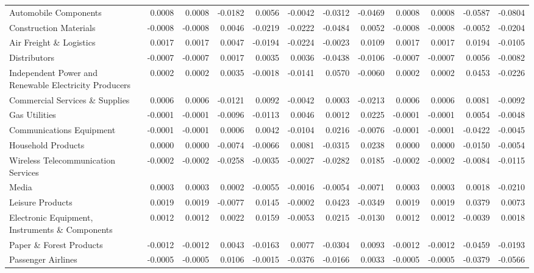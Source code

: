 \begin{table}
\begin{tabular}{lrrrrrrrrrrr}
Automobile Components & 0.0008 & 0.0008 & -0.0182 & 0.0056 & -0.0042 & -0.0312 & -0.0469 & 0.0008 & 0.0008 & -0.0587 & -0.0804 \\
Construction Materials & -0.0008 & -0.0008 & 0.0046 & -0.0219 & -0.0222 & -0.0484 & 0.0052 & -0.0008 & -0.0008 & -0.0052 & -0.0204 \\
Air Freight \& Logistics & 0.0017 & 0.0017 & 0.0047 & -0.0194 & -0.0224 & -0.0023 & 0.0109 & 0.0017 & 0.0017 & 0.0194 & -0.0105 \\
Distributors & -0.0007 & -0.0007 & 0.0017 & 0.0035 & 0.0036 & -0.0438 & -0.0106 & -0.0007 & -0.0007 & 0.0056 & -0.0082 \\
Independent Power and Renewable Electricity Producers & 0.0002 & 0.0002 & 0.0035 & -0.0018 & -0.0141 & 0.0570 & -0.0060 & 0.0002 & 0.0002 & 0.0453 & -0.0226 \\
Commercial Services \& Supplies & 0.0006 & 0.0006 & -0.0121 & 0.0092 & -0.0042 & 0.0003 & -0.0213 & 0.0006 & 0.0006 & 0.0081 & -0.0092 \\
Gas Utilities & -0.0001 & -0.0001 & -0.0096 & -0.0113 & 0.0046 & 0.0012 & 0.0225 & -0.0001 & -0.0001 & 0.0054 & -0.0048 \\
Communications Equipment & -0.0001 & -0.0001 & 0.0006 & 0.0042 & -0.0104 & 0.0216 & -0.0076 & -0.0001 & -0.0001 & -0.0422 & -0.0045 \\
Household Products & 0.0000 & 0.0000 & -0.0074 & -0.0066 & 0.0081 & -0.0315 & 0.0238 & 0.0000 & 0.0000 & -0.0150 & -0.0054 \\
Wireless Telecommunication Services & -0.0002 & -0.0002 & -0.0258 & -0.0035 & -0.0027 & -0.0282 & 0.0185 & -0.0002 & -0.0002 & -0.0084 & -0.0115 \\
Media & 0.0003 & 0.0003 & 0.0002 & -0.0055 & -0.0016 & -0.0054 & -0.0071 & 0.0003 & 0.0003 & 0.0018 & -0.0210 \\
Leisure Products & 0.0019 & 0.0019 & -0.0077 & 0.0145 & -0.0002 & 0.0423 & -0.0349 & 0.0019 & 0.0019 & 0.0379 & 0.0073 \\
Electronic Equipment, Instruments \& Components & 0.0012 & 0.0012 & 0.0022 & 0.0159 & -0.0053 & 0.0215 & -0.0130 & 0.0012 & 0.0012 & -0.0039 & 0.0018 \\
Paper \& Forest Products & -0.0012 & -0.0012 & 0.0043 & -0.0163 & 0.0077 & -0.0304 & 0.0093 & -0.0012 & -0.0012 & -0.0459 & -0.0193 \\
Passenger Airlines & -0.0005 & -0.0005 & 0.0106 & -0.0015 & -0.0376 & -0.0166 & 0.0033 & -0.0005 & -0.0005 & -0.0379 & -0.0566 \\

\end{tabular}
\end{table}
